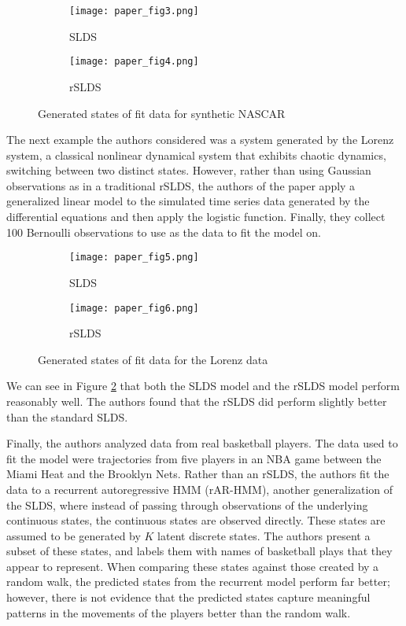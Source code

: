 \begin{figure}[h!]
	\centering
	\begin{subfigure}[b]{0.35\textwidth}
		\texttt{[image: paper\_fig3.png]}
		\caption{SLDS}
	\end{subfigure}
	\begin{subfigure}[b]{0.35\textwidth}
		\texttt{[image: paper\_fig4.png]}
		\caption{rSLDS}
	\end{subfigure}
	\caption{Generated states of fit data for synthetic NASCAR}
	\label{Nascargen}
\end{figure}

The next example the authors considered was a system generated by the Lorenz system, a classical nonlinear dynamical system that exhibits chaotic dynamics, switching between two distinct states. However, rather than using Gaussian observations as in a traditional rSLDS, the authors of the paper apply a generalized linear model to the simulated time series data generated by the differential equations and then apply the logistic function. Finally, they collect 100 Bernoulli observations to use as the data to fit the model on.

\begin{figure}[h!]
	\centering
	\begin{subfigure}[b]{0.35\textwidth}
		\texttt{[image: paper\_fig5.png]}
		\caption{SLDS}
	\end{subfigure}
	\begin{subfigure}[b]{0.35\textwidth}
		\texttt{[image: paper\_fig6.png]}
		\caption{rSLDS}
	\end{subfigure}
	\caption{Generated states of fit data for the Lorenz data}
	\label{Lorenzgen}
\end{figure}

We can see in Figure \ref{Lorenzgen} that both the SLDS model and the rSLDS model perform reasonably well. The authors found that the rSLDS did perform slightly better than the standard SLDS.

Finally, the authors analyzed data from real basketball players. The data used to fit the model were trajectories from five players in an NBA game between the Miami Heat and the Brooklyn Nets. Rather than an rSLDS, the authors fit the data to a recurrent autoregressive HMM (rAR-HMM), another generalization of the SLDS, where instead of passing through observations of the underlying continuous states, the continuous states are observed directly. These states are assumed to be generated by $K$ latent discrete states. The authors present a subset of these states, and labels them with names of basketball plays that they appear to represent. When comparing these states against those created by a random walk, the predicted states from the recurrent model perform far better; however, there is not evidence that the predicted states capture meaningful patterns in the movements of the players better than the random walk.

